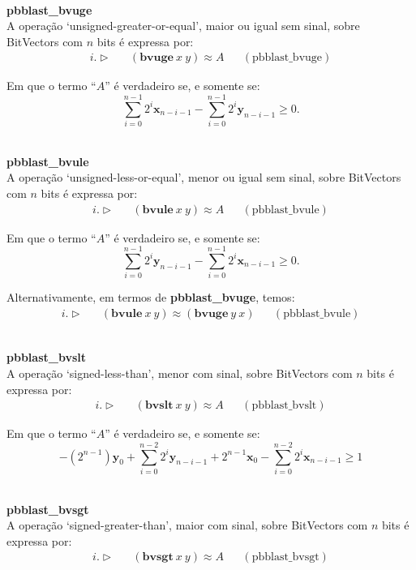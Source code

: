 \documentclass[conference]{IEEEtran}
\begin{document}
\noindent\\
\textbf{pbblast\_bvuge}\\
A operação `unsigned-greater-or-equal', maior ou igual sem sinal, sobre BitVectors com $n$ bits é expressa por:
\begin{align*}
    i. \vartriangleright &  & (\textbf{bvuge}\ x\ y) \approx A &  & (\text{pbblast\_bvuge})
\end{align*}

Em que o termo ``$A$'' é verdadeiro se, e somente se:
\[
    \sum_{i=0}^{n-1} 2^i\mathbf{x}_{n-i-1} - \sum_{i=0}^{n-1} 2^i\mathbf{y}_{n-i-1} \ge 0.
\]

\noindent\\
\textbf{pbblast\_bvule}\\
A operação `unsigned-less-or-equal', menor ou igual sem sinal, sobre BitVectors com $n$ bits é expressa por:
\begin{align*}
    i. \vartriangleright &  & (\textbf{bvule}\ x\ y) \approx A &  & (\text{pbblast\_bvule})
\end{align*}

Em que o termo ``$A$'' é verdadeiro se, e somente se:
\[
    \sum_{i=0}^{n-1} 2^i\mathbf{y}_{n-i-1} - \sum_{i=0}^{n-1} 2^i\mathbf{x}_{n-i-1} \ge 0.
\]

Alternativamente, em termos de \textbf{pbblast\_bvuge}, temos:
\begin{align*}
    i. \vartriangleright &  & (\textbf{bvule}\ x\ y) \approx (\textbf{bvuge}\ y\ x) &  & (\text{pbblast\_bvule})
\end{align*}

\noindent\\
\textbf{pbblast\_bvslt}\\
A operação `signed-less-than', menor com sinal, sobre BitVectors com $n$ bits é expressa por:
\begin{align*}
    i. \vartriangleright &  & (\textbf{bvslt}\ x\ y) \approx A &  & (\text{pbblast\_bvslt})
\end{align*}

Em que o termo ``$A$'' é verdadeiro se, e somente se:
\[
    -(2^{n-1})\mathbf{y}_0 + \sum_{i=0}^{n-2} 2^i\mathbf{y}_{n-i-1} + 2^{n-1} \mathbf{x}_{0} - \sum_{i=0}^{n-2} 2^i\mathbf{x}_{n-i-1} \geq 1
\]

\noindent\\
\textbf{pbblast\_bvsgt}\\
A operação `signed-greater-than', maior com sinal, sobre BitVectors com $n$ bits é expressa por:
\begin{align*}
    i. \vartriangleright &  & (\textbf{bvsgt}\ x\ y) \approx A &  & (\text{pbblast\_bvsgt})
\end{align*}
\end{document}

